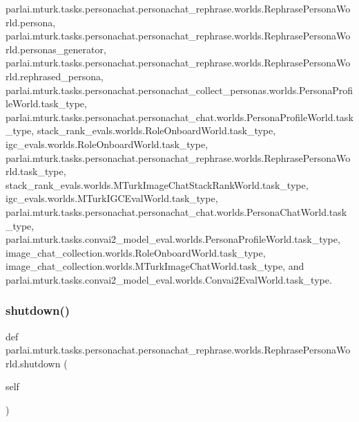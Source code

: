 parlai.\+mturk.\+tasks.\+personachat.\+personachat\+\_\+rephrase.\+worlds.\+Rephrase\+Persona\+World.\+persona, parlai.\+mturk.\+tasks.\+personachat.\+personachat\+\_\+rephrase.\+worlds.\+Rephrase\+Persona\+World.\+personas\+\_\+generator, parlai.\+mturk.\+tasks.\+personachat.\+personachat\+\_\+rephrase.\+worlds.\+Rephrase\+Persona\+World.\+rephrased\+\_\+persona, parlai.\+mturk.\+tasks.\+personachat.\+personachat\+\_\+collect\+\_\+personas.\+worlds.\+Persona\+Profile\+World.\+task\+\_\+type, parlai.\+mturk.\+tasks.\+personachat.\+personachat\+\_\+chat.\+worlds.\+Persona\+Profile\+World.\+task\+\_\+type, stack\+\_\+rank\+\_\+evals.\+worlds.\+Role\+Onboard\+World.\+task\+\_\+type, igc\+\_\+evals.\+worlds.\+Role\+Onboard\+World.\+task\+\_\+type, parlai.\+mturk.\+tasks.\+personachat.\+personachat\+\_\+rephrase.\+worlds.\+Rephrase\+Persona\+World.\+task\+\_\+type, stack\+\_\+rank\+\_\+evals.\+worlds.\+M\+Turk\+Image\+Chat\+Stack\+Rank\+World.\+task\+\_\+type, igc\+\_\+evals.\+worlds.\+M\+Turk\+I\+G\+C\+Eval\+World.\+task\+\_\+type, parlai.\+mturk.\+tasks.\+personachat.\+personachat\+\_\+chat.\+worlds.\+Persona\+Chat\+World.\+task\+\_\+type, parlai.\+mturk.\+tasks.\+convai2\+\_\+model\+\_\+eval.\+worlds.\+Persona\+Profile\+World.\+task\+\_\+type, image\+\_\+chat\+\_\+collection.\+worlds.\+Role\+Onboard\+World.\+task\+\_\+type, image\+\_\+chat\+\_\+collection.\+worlds.\+M\+Turk\+Image\+Chat\+World.\+task\+\_\+type, and parlai.\+mturk.\+tasks.\+convai2\+\_\+model\+\_\+eval.\+worlds.\+Convai2\+Eval\+World.\+task\+\_\+type.

\mbox{\label{classparlai_1_1mturk_1_1tasks_1_1personachat_1_1personachat__rephrase_1_1worlds_1_1RephrasePersonaWorld_abe6f2632804c97abb5889f55aefecaa1}} 
\subsubsection{\texorpdfstring{shutdown()}{shutdown()}}
{\footnotesize\ttfamily def parlai.\+mturk.\+tasks.\+personachat.\+personachat\+\_\+rephrase.\+worlds.\+Rephrase\+Persona\+World.\+shutdown (\begin{DoxyParamCaption}\item[{}]{self }\end{DoxyParamCaption})}



